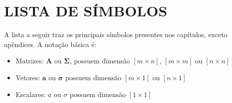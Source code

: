\newpage
\section*{\centering LISTA DE SÍMBOLOS}


A lista a seguir traz os principais símbolos presentes nos capítulos, exceto apêndices. A notação básica é:
\begin{itemize}
\item Matrizes: $\mathbf{A}$ ou $\bm{\Sigma}$, possuem dimensão $[m \times  n]$, $[m \times  m]$ ou $[n \times  n]$ 
\item Vetores: $\mathbf{a}$ ou $\bm{\sigma}$ possuem dimensão $[m  \times  1]$ ou $[n \times 1]$ 
\item Escalares: $a$ ou $\sigma$  possuem dimensão $[1  \times  1]$ 
\end{itemize}

